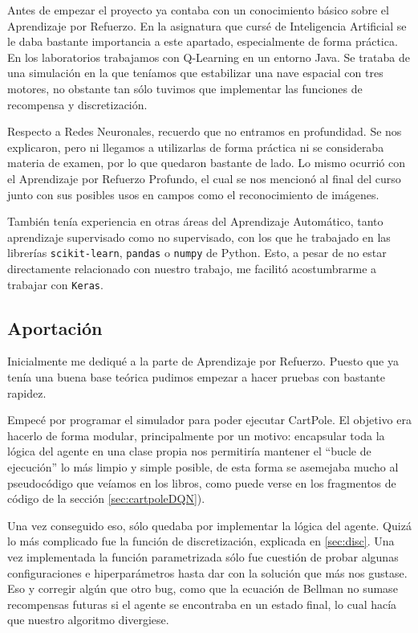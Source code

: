 Antes de empezar el proyecto ya contaba con un conocimiento básico sobre el Aprendizaje por Refuerzo. En la asignatura que cursé de Inteligencia Artificial se le daba bastante importancia a este apartado, especialmente de forma práctica. En los laboratorios trabajamos con Q-Learning en un entorno Java. Se trataba de una simulación en la que teníamos que estabilizar una nave espacial con tres motores, no obstante tan sólo tuvimos que implementar las funciones de recompensa y discretización.

Respecto a Redes Neuronales, recuerdo que no entramos en profundidad. Se nos explicaron, pero ni llegamos a utilizarlas de forma práctica ni se consideraba materia de examen, por lo que quedaron bastante de lado. Lo mismo ocurrió con el Aprendizaje por Refuerzo Profundo, el cual se nos mencionó al final del curso junto con sus posibles usos en campos como el reconocimiento de imágenes.

También tenía experiencia en otras áreas del Aprendizaje Automático, tanto aprendizaje supervisado como no supervisado, con los que he trabajado en las librerías \texttt{scikit-learn}, \texttt{pandas} o \texttt{numpy} de Python. Esto, a pesar de no estar directamente relacionado con nuestro trabajo, me facilitó acostumbrarme a trabajar con \texttt{Keras}.


\subsection{Aportación}

Inicialmente me dediqué a la parte de Aprendizaje por Refuerzo. Puesto que ya tenía una buena base teórica pudimos empezar a hacer pruebas con bastante rapidez.

Empecé por programar el simulador para poder ejecutar CartPole. El objetivo era hacerlo de forma modular, principalmente por un motivo: encapsular toda la lógica del agente en una clase propia nos permitiría mantener el ``bucle de ejecución'' lo más limpio y simple posible, de esta forma se asemejaba mucho al pseudocódigo que veíamos en los libros, como puede verse en los fragmentos de código de la sección \ref{sec:cartpoleDQN}).

Una vez conseguido eso, sólo quedaba por implementar la lógica del agente. Quizá lo más complicado fue la función de discretización, explicada en \ref{sec:disc}. Una vez implementada la función parametrizada sólo fue cuestión de probar algunas configuraciones e hiperparámetros hasta dar con la solución que más nos gustase. Eso y corregir algún que otro bug, como que la ecuación de Bellman no sumase recompensas futuras si el agente se encontraba en un estado final, lo cual hacía que nuestro algoritmo divergiese.

